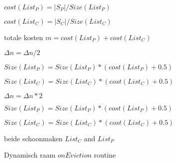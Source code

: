 \begin{algorithm}[htbp]
    \DontPrintSemicolon

    $cost(List_P) = |S_P| / Size(List_P)$      
    
    $cost(List_C) = |S_C| / Size(List_C)$     


    totale kosten $ m = cost(List_P) + cost(List_C)$  
  
    {
    
        $\Delta n = \Delta n / 2 $ 
        
        $Size(List_P) = Size(List_P) * (cost(List_P) + 0.5)$  

        $Size(List_C) = Size(List_C) * (cost(List_C) + 0.5)$  
    }
    {
   
        $\Delta n = \Delta n * 2$ 

        $Size(List_P) = Size(List_P) * (cost(List_P) + 0.5)$  

        $Size(List_C) = Size(List_C) * (cost(List_C) + 0.5)$  
    }

    beide schoonmaken $List_C \text{ and } List_P$
    \caption{Dynamisch raam $onEviction$ routine}
    \label{alg:dynamic_eviction}
\end{algorithm}



